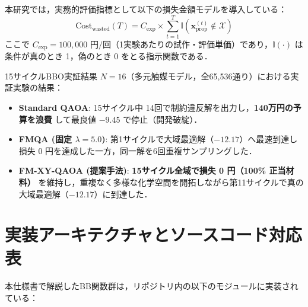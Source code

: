 \documentclass[11pt,a4paper]{ltjsarticle}
\begin{document}
本研究では，実務的評価指標として以下の損失金額モデルを導入している：
\begin{equation}
\mathrm{Cost}_{\mathrm{wasted}}(T) = C_{\mathrm{exp}} \times \sum_{t=1}^T \mathbb{I}(\bm{x}_{\mathrm{prop}}^{(t)} \notin \mathcal{X})
\end{equation}
ここで $C_{\mathrm{exp}} = 100,000 \text{ 円/回}$（1実験あたりの試作・評価単価）であり，$\mathbb{I}(\cdot)$ は条件が真のとき 1，偽のとき 0 をとる指示関数である．
\begin{keybox}{15サイクルBBO実証結果}
$N=16$（多元触媒モデル，全65,536通り）における実証実験の結果：
\begin{itemize}
    \item \textbf{Standard QAOA}: 15サイクル中 14回で制約違反解を出力し，\textbf{140万円の予算を浪費} して最良値 $-9.45$ で停止（開発破綻）．
    \item \textbf{FMQA (固定 $\lambda=5.0$)}: 第1サイクルで大域最適解（$-12.17$）へ最速到達し損失 0 円を達成した一方，同一解を6回重複サンプリングした．
    \item \textbf{FM-XY-QAOA (提案手法)}: \textbf{15サイクル全域で損失 0 円（100\% 正当材料）} を維持し，重複なく多様な化学空間を開拓しながら第11サイクルで真の大域最適解（$-12.17$）に到達した．
\end{itemize}
\end{keybox}

\section{実装アーキテクチャとソースコード対応表}
\label{sec:code_reference}
本仕様書で解説したBB関数群は，リポジトリ内の以下のモジュールに実装されている：
\end{document}
